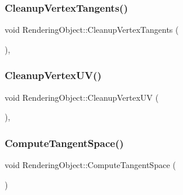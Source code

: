 \hypertarget{class_rendering_object_a0e6c8c9480f1c04202aa6d38a841f06f}{}\label{class_rendering_object_a0e6c8c9480f1c04202aa6d38a841f06f} 
\subsubsection{\texorpdfstring{Cleanup\+Vertex\+Tangents()}{CleanupVertexTangents()}}
{\footnotesize\ttfamily void Rendering\+Object\+::\+Cleanup\+Vertex\+Tangents (\begin{DoxyParamCaption}{ }\end{DoxyParamCaption})\hspace{0.3cm}{\ttfamily [protected]}, {\ttfamily [virtual]}}

\hypertarget{class_rendering_object_a776f54b41f9e9f0e55fc1104919c3e7c}{}\label{class_rendering_object_a776f54b41f9e9f0e55fc1104919c3e7c} 
\subsubsection{\texorpdfstring{Cleanup\+Vertex\+U\+V()}{CleanupVertexUV()}}
{\footnotesize\ttfamily void Rendering\+Object\+::\+Cleanup\+Vertex\+UV (\begin{DoxyParamCaption}{ }\end{DoxyParamCaption})\hspace{0.3cm}{\ttfamily [protected]}, {\ttfamily [virtual]}}

\hypertarget{class_rendering_object_adec25796def807fd09a5fc4f1fbd0c41}{}\label{class_rendering_object_adec25796def807fd09a5fc4f1fbd0c41} 
\subsubsection{\texorpdfstring{Compute\+Tangent\+Space()}{ComputeTangentSpace()}}
{\footnotesize\ttfamily void Rendering\+Object\+::\+Compute\+Tangent\+Space (\begin{DoxyParamCaption}{ }\end{DoxyParamCaption})\hspace{0.3cm}{\ttfamily [virtual]}}


